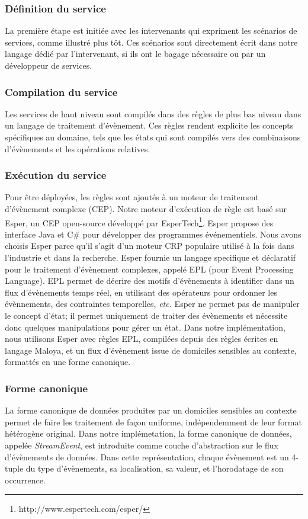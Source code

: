 \subsubsection{Définition du service}
La première étape est initiée avec les intervenants qui expriment les scénarios de services, comme illustré plus tôt. Ces scénarios sont directement écrit dans notre langage dédié par l'intervenant, si ils ont le bagage nécessaire ou par un développeur de services.

\subsubsection{Compilation du service}
Les services de haut niveau sont compilés dans des règles de plus bas niveau dans un langage de traitement d'évènement. Ces règles rendent explicite les concepts spécifiques au domaine, tels que les états qui sont compilés vers des combinaisons d'évènements et les opérations relatives.

\subsubsection{Exécution du service}
Pour être déployées, les règles sont ajoutés à un moteur de traitement d'évènement complexe (CEP). Notre moteur d'exécution de règle est basé sur Esper, un CEP open-source développé par EsperTech\footnote{http://www.espertech.com/esper/}. Esper propose des interface Java et C\# pour développer des programmes événementiels. Nous avons choisis Esper parce qu'il s'agit d'un moteur CRP populaire utilisé à la fois dans l'industrie et dans la recherche. Esper fournie un langage specifique et déclaratif pour le traitement d'évènement complexes, appelé EPL (pour Event Processing Language). EPL permet de décrire des motifs d'évènements à identifier dans un flux d'évènements temps réel, en utilisant des opérateurs pour ordonner les évènnements, des contraintes temporelles, {\em etc.} Esper ne permet pas de manipuler le concept d'état; il permet uniquement de traiter des évènements et nécessite donc quelques manipulations pour gérer un état. Dans notre implémentation, nous utilisons Esper avec règles EPL, compilées depuis des règles écrites en langage Maloya, et un flux d'évènement issue de domiciles sensibles au contexte, formattés en une forme canonique.

\subsubsection{Forme canonique}
La forme canonique de données produites par un domiciles sensibles au contexte permet de faire les traitement de façon uniforme, indépendemment de leur format hétérogène original. Dans notre implémetation, la forme canonique de données, appelée {\em StreamEvent}, est introduite comme couche d'abstraction sur le flux d'évènements de données. Dans cette représentation, chaque évènement est un 4-tuple du type d'évènements, sa localisation, sa valeur, et l'horodatage de son occurrence.


